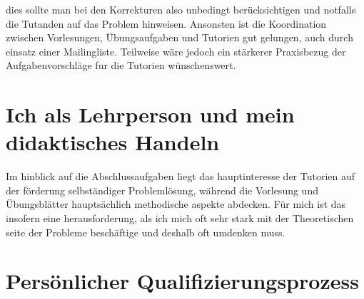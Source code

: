 \documentclass[%
fontsize=12pt,
paper=a4,
oneside,
DIV=11,
BCOR=0cm,
pagesize=automedia,
parskip=false,
headings=normal,
titlepage=true%
]{scrartcl}
\begin{document}
dies sollte man bei den Korrekturen also unbedingt ber\"{u}cksichtigen und notfalls die Tutanden auf das Problem hinweisen.
Ansonsten ist die Koordination zwischen Vorlesungen, \"{U}bungsaufgaben und Tutorien gut gelungen, auch durch einsatz einer
Mailingliste. Teilweise w\"{a}re jedoch ein st\"{a}rkerer Praxisbezug der Aufgabenvorschl\"{a}ge fur die Tutorien
w\"{u}nschenswert.

\section{Ich als Lehrperson und mein didaktisches Handeln}
Im hinblick auf die Abschlussaufgaben liegt das hauptinteresse der Tutorien auf der f\"{o}rderung selbst\"{a}ndiger
Probleml\"{o}sung, w\"{a}hrend die Vorlesung und \"{U}bungsbl\"{a}tter haupts\"{a}chlich methodische aspekte abdecken.
F\"{u}r mich ist das insofern eine herausforderung, als ich mich oft sehr stark mit der Theoretischen seite
der Probleme besch\"{a}ftige und deshalb oft umdenken muss.

\section{Pers\"{o}nlicher Qualifizierungsprozess}
\end{document}
